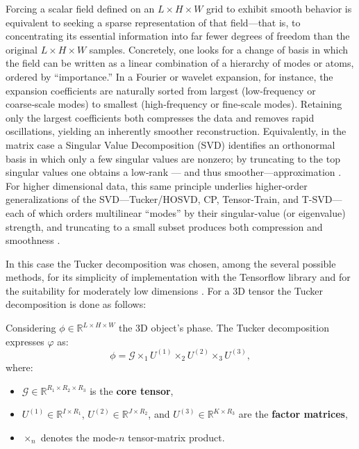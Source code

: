 Forcing a scalar field defined on an  $L\times H\times W$ grid to exhibit smooth behavior is equivalent to seeking a 
sparse representation of that field—that is, to concentrating its essential information into far fewer degrees of freedom 
than the original $L\times H\times W$ samples. 
Concretely, one looks for a change of basis in which the field can be written as a linear combination of a hierarchy 
of modes or atoms, ordered by “importance.” In a Fourier or wavelet expansion, for instance, the expansion coefficients 
are naturally sorted from largest (low‑frequency or coarse‑scale modes) to smallest (high‑frequency or fine‑scale modes). 
Retaining only the largest coefficients both compresses the data and removes rapid oscillations, yielding an inherently 
smoother reconstruction. Equivalently, in the matrix case a Singular Value Decomposition (SVD) identifies an orthonormal 
basis in which only a few singular values are nonzero; by truncating to the top singular values one obtains a low‑rank 
— and thus smoother—approximation \cite{golub1996matrix}. For higher dimensional data, this same principle underlies 
higher-order generalizations of the SVD—Tucker/HOSVD, CP, Tensor-Train, and T-SVD—each of which orders multilinear 
“modes” by their singular-value (or eigenvalue) strength, and truncating to a small subset produces both compression 
and smoothness \cite{Kolda_TT}. 

In this case the Tucker decomposition was chosen, among the several possible methods, for its simplicity of implementation 
with the Tensorflow library and for the suitability for moderately low dimensions \cite{Oseledets_TT}. 
For a 3D tensor the Tucker decomposition is done as follows: 

Considering \(\mathcal{\phi} \in \mathbb{R}^{L \times H \times W}\) the 3D object's phase. The Tucker decomposition expresses \(\mathcal{\varphi}\) as:
\[
\mathcal{\phi} = \mathcal{G} \times_1 U^{(1)} \times_2 U^{(2)} \times_3 U^{(3)},
\]
where:
\begin{itemize}
  \item \(\mathcal{G} \in \mathbb{R}^{R_1 \times R_2 \times R_3}\) is the \textbf{core tensor},
  \item \(U^{(1)} \in \mathbb{R}^{I \times R_1}\), \(U^{(2)} \in \mathbb{R}^{J \times R_2}\), and \(U^{(3)} \in \mathbb{R}^{K \times R_3}\) are the \textbf{factor matrices},
  \item \(\times_n\) denotes the mode-\(n\) tensor-matrix product.
\end{itemize}

